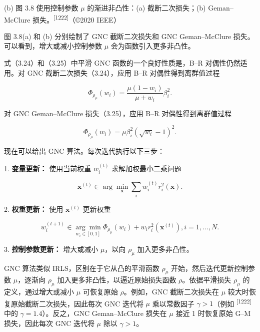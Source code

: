 (b)
图 3.8 使用控制参数 $\mu$ 的渐进非凸性：(a) 截断二次损失；(b) Geman–McClure 损失。\textsuperscript{[1222]}（©2020 IEEE）

图 3.8(a) 和 (b) 分别绘制了 GNC 截断二次损失和 GNC Geman–McClure 损失。可以看到，增大或减小控制参数 $\mu$ 会为函数引入更多非凸性。

式（3.24）和（3.25）中平滑 GNC 函数的一个良好性质是，B–R 对偶性仍然适用。对 GNC 截断二次损失（3.24），应用 B–R 对偶性得到离群值过程

\begin{equation*}
\Phi_ {\rho_ {\mu}} (w _ {i}) = \frac {\mu (1 - w _ {i})}{\mu + w _ {i}} \beta_ {i} ^ {2}.
\end{equation*}

对 GNC Geman–McClure 损失（3.25），应用 B–R 对偶性得到离群值过程

\begin{equation*}
\Phi_ {\rho_ {\mu}} (w _ {i}) = \mu \beta_ {i} ^ {2} (\sqrt {w _ {i}} - 1) ^ {2}.
\end{equation*}

现在可以给出 GNC 算法。每次迭代执行以下三步：

1. \textbf{变量更新：} 使用当前权重 $w _ { i } ^ { ( t ) }$ 求解加权最小二乘问题

\begin{equation}
\boldsymbol {x} ^ {(t)} \in \arg \min _ {\boldsymbol {x}} \sum_ {i} w _ {i} ^ {(t)} r _ {i} ^ {2} (\boldsymbol {x}).\tag{3.26}
\end{equation}

2. \textbf{权重更新：} 使用 $\mathbf { \boldsymbol { x } } ^ { ( t ) }$ 更新权重

\begin{equation}
w _ {i} ^ {(t + 1)} \in \underset {w _ {i} \in [ 0, 1 ]} {\arg \min} \Phi_ {\rho_ {\mu}} (w _ {i}) + w _ {i} r _ {i} ^ {2} (\boldsymbol {x} ^ {(t)}), i = 1, \ldots , N.\tag{3.27}
\end{equation}

3. \textbf{控制参数更新：} 增大或减小 $\mu$，以向 $\rho _ { \mu }$ 加入更多非凸性。

GNC 算法类似 IRLS，区别在于它从凸的平滑函数 $\rho _ { \mu }$ 开始，然后迭代更新控制参数 $\mu$，逐渐向 $\rho _ { \mu }$ 加入更多非凸性，以逼近原始损失函数 $\rho$。依据平滑损失 $\rho _ { \mu }$ 的定义，通过增大或减小 $\mu$ 可恢复原始 $\rho$。例如，GNC 截断二次损失在 $\mu$ 较大时恢复原始截断二次损失，因此每次 GNC 迭代将 $\mu$ 乘以常数因子 $\gamma > 1$（例如 \textsuperscript{[1222]} 中的 $\gamma = 1 . 4$）。反之，GNC Geman–McClure 损失在 $\mu$ 接近 1 时恢复原始 G–M 损失，因此每次 GNC 迭代将 $\mu$ 除以 $\gamma > 1$。

